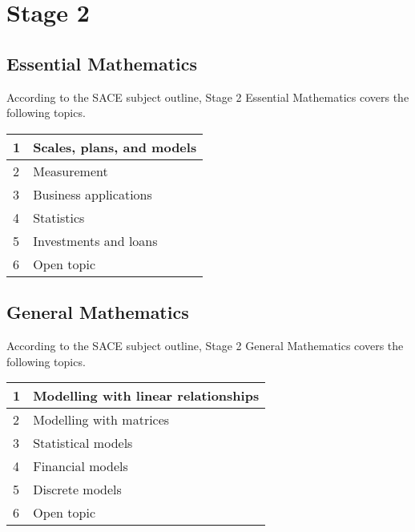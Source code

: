 \documentclass[12pt]{report}
\begin{document}
\section{Stage 2}
\subsection{Essential Mathematics}

    According to the SACE subject outline, Stage 2 Essential Mathematics covers the following topics.
    \begin{table}[H]
        \centering
        \begin{tabular}{|l|l|}
        \hline
            1 & Scales, plans, and models \\ \hline
            2 & Measurement \\ \hline
            3 & Business applications \\ \hline
            4 & Statistics \\ \hline
            5 & Investments and loans \\ \hline
            6 & Open topic \\ \hline
        \end{tabular}
    \end{table}

\subsection{General Mathematics}

    According to the SACE subject outline, Stage 2 General Mathematics covers the following topics.
    \begin{table}[H]
        \centering
        \begin{tabular}{|l|l|}
        \hline
            1 & Modelling with linear relationships \\ \hline
            2 & Modelling with matrices \\ \hline
            3 & Statistical models \\ \hline
            4 & Financial models \\ \hline
            5 & Discrete models \\ \hline
            6 & Open topic \\ \hline
        \end{tabular}
    \end{table}
\end{document}

